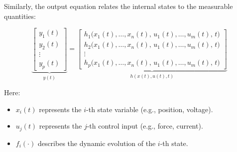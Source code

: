 Similarly, the output equation relates the internal states to the measurable quantities:

\begin{equation}
	\underbrace{
		\begin{bmatrix}
			y_1(t) \\
			y_2(t) \\
			\vdots \\
			y_p(t)
		\end{bmatrix}
	}_{y(t)}
	=
	\underbrace{
		\begin{bmatrix}
			h_1 \big( x_1(t), \dots, x_n(t), \, u_1(t), \dots, u_m(t), \, t \big) \\
			h_2 \big( x_1(t), \dots, x_n(t), \, u_1(t), \dots, u_m(t), \, t \big) \\
			\vdots \\
			h_p \big( x_1(t), \dots, x_n(t), \, u_1(t), \dots, u_m(t), \, t \big)
		\end{bmatrix}
	}_{h(x(t), u(t), t)}
\end{equation}

Here:
\begin{itemize}
	\item $x_i(t)$ represents the $i$-th state variable (e.g., position, voltage).
	\item $u_j(t)$ represents the $j$-th control input (e.g., force, current).
	\item $f_i(\cdot)$ describes the dynamic evolution of the $i$-th state.
\end{itemize}


